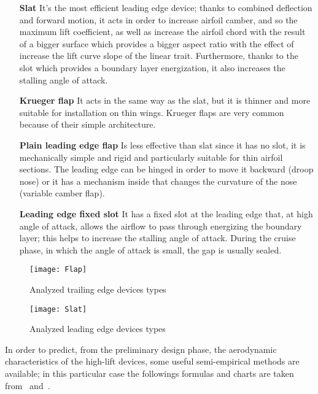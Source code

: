 \begin{itemize}
\item[\textbf{Slat}]  It's the most efficient leading edge device; thanks to combined deflection and forward motion, it acts in order to increase airfoil camber, and so the maximum lift coefficient, as well as increase the airfoil chord with the result of a bigger surface which provides a bigger aspect ratio with the effect of increase the lift curve slope of the linear trait. Furthermore, thanks to the slot which provides a boundary layer energization, it also increases the stalling angle of attack.
\item[\textbf{Krueger flap}]  It acts in the same way as the slat, but it is thinner and more suitable for installation on thin wings. Krueger flaps are very common because of their simple architecture.
\item[\textbf{Plain leading edge flap}] Is less effective than slat since it has no slot, it is mechanically simple and rigid and particularly suitable for thin airfoil sections. The leading edge can be hinged in order to move it backward (droop nose) or it has a mechanism inside that changes the curvature of the nose (variable camber flap).
\item[\textbf{Leading edge fixed slot}] It has a fixed slot at the leading edge that, at high angle of attack, allows the airflow to pass through energizing the boundary layer; this helps to increase the stalling angle of attack. During the cruise phase, in which the angle of attack is small, the gap is usually sealed.
\end{itemize}
%
\begin{figure}[!t]
  \centering
  \texttt{[image: Flap]}
  \caption{Analyzed trailing edge devices types}
  \label{fig:FlapTypes}
\end{figure}
%
\begin{figure}[!t]
  \centering
  \texttt{[image: Slat]}
  \caption{Analyzed leading edge devices types}
  \label{fig:SlatTypes}
\end{figure}
%
\noindent
In order to predict, from the preliminary design phase, the aerodynamic characteristics of the high-lift devices, some useful semi-empirical methods are available; in this particular case the followings formulas and charts are taken from~\cite{torenbeek1982synthesis} and~\cite{sforza2014commercial}.

